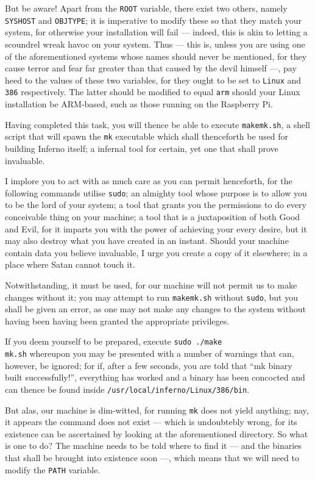 \documentclass[a5paper,twoside,12pt]{report}
\begin{document}
But be aware! Apart from the \texttt{ROOT} variable, there exist two others, namely \texttt{SYSHOST} and \texttt{OBJTYPE}; it is imperative to modify these so that they match your system, for otherwise your installation will fail — indeed, this is akin to letting a scoundrel wreak havoc on your system. Thus — this is, unless you are using one of the aforementioned systems whose names should never be mentioned, for they cause terror and fear far greater than that caused by the devil himself —, pay heed to the values of these two variables, for they ought to be set to \texttt{Linux} and \texttt{386} respectively. The latter should be modified to equal \texttt{arm} should your Linux installation be ARM-based, such as those running on the Raspberry Pi.

Having completed this task, you will thence be able to execute \texttt{makemk.sh}, a shell script that will spawn the \texttt{mk} executable which shall thenceforth be used for building Inferno itself; a infernal tool for certain, yet one that shall prove invaluable.

I implore you to act with as much care as you can permit henceforth, for the following commands utilise \texttt{sudo}; an almighty tool whose purpose is to allow you to be the lord of your system; a tool that grants you the permissions to do every conceivable thing on your machine; a tool that is a juxtaposition of both Good and Evil, for it imparts you with the power of achieving your every desire, but it may also destroy what you have created in an instant. Should your machine contain data you believe invaluable, I urge you create a copy of it elsewhere; in a place where Satan cannot touch it.

Notwithstanding, it must be used, for our machine will not permit us to make changes without it; you may attempt to run \texttt{makemk.sh} without \texttt{sudo}, but you shall be given an error, as one may not make any changes to the system without having been having been granted the appropriate privileges.

If you deem yourself to be prepared, execute \texttt{sudo ./make\\mk.sh} whereupon you may be presented with a number of warnings that can, however, be ignored; for if, after a few seconds, you are told that ``mk binary built successfully!'', everything has worked and a binary has been concocted and can thence be found inside \texttt{/usr/local/inferno/Linux/386/bin}.

But alas, our machine is dim-witted, for running \texttt{mk} does not yield anything; nay, it appears the command does not exist — which is undoubtebly wrong, for its existence can be ascertained by looking at the aforementioned directory. So what is one to do? The machine needs to be told where to find it — and the binaries that shall be brought into existence soon —, which means that we will need to modify the \texttt{PATH} variable.
\end{document}

